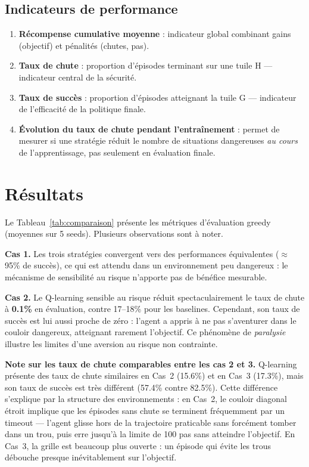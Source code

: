 \documentclass{article}
\begin{document}
\subsection{Indicateurs de performance}

\begin{enumerate}[noitemsep, topsep=0pt]
    \item \textbf{Récompense cumulative moyenne} : indicateur global combinant gains (objectif) et pénalités (chutes, pas).
    \item \textbf{Taux de chute} : proportion d'épisodes terminant sur une tuile H — indicateur central de la sécurité.
    \item \textbf{Taux de succès} : proportion d'épisodes atteignant la tuile G — indicateur de l'efficacité de la politique finale.
    \item \textbf{Évolution du taux de chute pendant l'entraînement} : permet de mesurer si une stratégie réduit le nombre de situations dangereuses \textit{au cours} de l'apprentissage, pas seulement en évaluation finale.
\end{enumerate}

\section{Résultats}

Le Tableau~\ref{tab:comparaison} présente les métriques d'évaluation greedy (moyennes sur 5 seeds). Plusieurs observations sont à noter.

\textbf{Cas 1.} Les trois stratégies convergent vers des performances équivalentes ($\approx$95\% de succès), ce qui est attendu dans un environnement peu dangereux : le mécanisme de sensibilité au risque n'apporte pas de bénéfice mesurable.

\textbf{Cas 2.} Le Q-learning sensible au risque réduit spectaculairement le taux de chute à \textbf{0.1\%} en évaluation, contre 17--18\% pour les baselines. Cependant, son taux de succès est lui aussi proche de zéro : l'agent a appris à ne pas s'aventurer dans le couloir dangereux, atteignant rarement l'objectif. Ce phénomène de \textit{paralysie} illustre les limites d'une aversion au risque non contrainte.

\textbf{Note sur les taux de chute comparables entre les cas 2 et 3.} Q-learning présente des taux de chute similaires en Cas~2 (15.6\%) et en Cas~3 (17.3\%), mais son taux de succès est très différent (57.4\% contre 82.5\%). Cette différence s'explique par la structure des environnements : en Cas~2, le couloir diagonal étroit implique que les épisodes sans chute se terminent fréquemment par un timeout — l'agent glisse hors de la trajectoire praticable sans forcément tomber dans un trou, puis erre jusqu'à la limite de 100 pas sans atteindre l'objectif. En Cas~3, la grille est beaucoup plus ouverte : un épisode qui évite les trous débouche presque inévitablement sur l'objectif.
\end{document}
